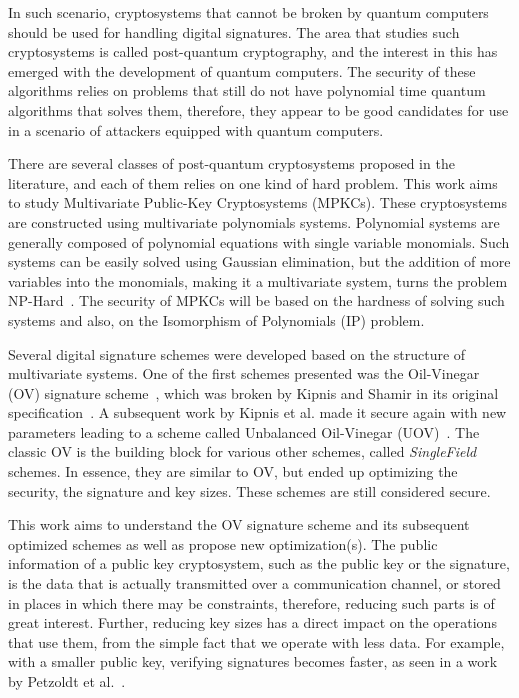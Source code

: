\documentclass{ufsctex/ufsctex}
\begin{document}
In such scenario, cryptosystems that cannot be broken by quantum computers
should be used for handling digital signatures. The area that studies such
cryptosystems is called post-quantum cryptography, and the interest in this
has emerged with the development of quantum computers. The security of these
algorithms relies on problems that still do not have polynomial time quantum
algorithms that solves them, therefore, they appear to be good candidates for
use in a scenario of attackers equipped with quantum computers.

There are several classes of post-quantum cryptosystems proposed in the
literature, and each of them relies on one kind of hard problem. This work aims
to study Multivariate Public-Key Cryptosystems (MPKCs). These cryptosystems are
constructed using multivariate polynomials systems. Polynomial systems are
generally composed of polynomial equations with single variable monomials. Such
systems can be easily solved using Gaussian elimination, but the addition of
more variables into the monomials, making it a multivariate system, turns the
problem NP-Hard~\cite{garey1990npc}. The security of MPKCs will be based on the
hardness of solving such systems and also, on the Isomorphism of Polynomials
(IP) problem.

Several digital signature schemes were developed based on the structure of
multivariate systems. One of the first schemes presented was the Oil-Vinegar
(OV) signature scheme~\cite{patarin1997ov}, which was broken by Kipnis and
Shamir in its original specification~\cite{kipnis1998cryptanalysis}. A
subsequent work by Kipnis et al. made it secure again with new parameters
leading to a scheme called Unbalanced Oil-Vinegar
(UOV)~\cite{kipnis1999unbalanced}. The classic OV is the building block for
various other schemes, called \textit{SingleField} schemes. In essence, they
are similar to OV, but ended up optimizing the security, the signature and key
sizes. These schemes are still considered secure.

This work aims to understand the OV signature scheme and its subsequent
optimized schemes as well as propose new optimization(s). The public
information of a public key cryptosystem, such as the public key or the
signature, is the data that is actually transmitted over a communication
channel, or stored in places in which there may be constraints, therefore,
reducing such parts is of great interest. Further, reducing key sizes has a
direct impact on the operations that use them, from the simple fact that we
operate with less data.  For example, with a smaller public key, verifying
signatures becomes faster, as seen in a work by Petzoldt et
al.~\cite{petzoldt2011small}.
\end{document}
